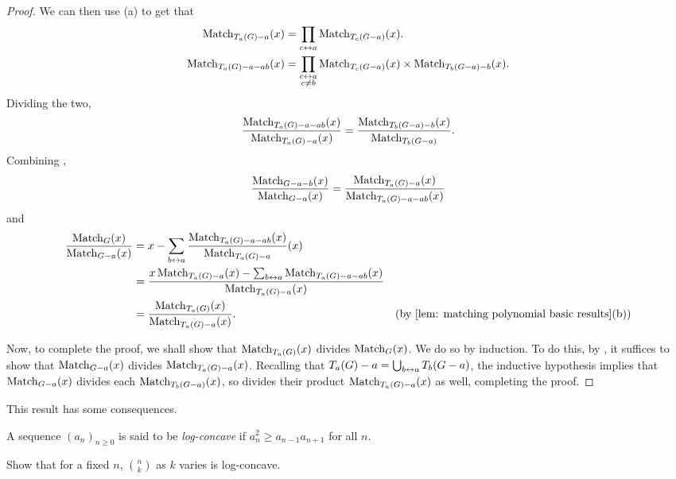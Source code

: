 \begin{proof}
		We can then use (a) to get that
		\begin{align*}
			\operatorname{Match}_{T_a(G)-a}(x) &= \prod_{c\leftrightarrow a} \operatorname{Match}_{T_c(G-a)}(x). \\
			\operatorname{Match}_{T_a(G)-a-ab}(x) &= \prod_{\substack{c \leftrightarrow a \\ c \ne b}} \operatorname{Match}_{T_c(G-a)}(x) \times \operatorname{Match}_{T_b(G-a)-b}(x).		
		\end{align*}
		Dividing the two,
		\begin{equation}
			\frac{\operatorname{Match}_{T_a(G)-a-ab}(x)}{\operatorname{Match}_{T_a(G)-a}(x)} = \frac{\operatorname{Match}_{T_b(G-a)-b}(x)}{\operatorname{Match}_{T_b(G-a)}}. \label{eqnmatch3}
		\end{equation}
		Combining ,
		\[ \frac{\operatorname{Match}_{G-a-b}(x)}{\operatorname{Match}_{G-a}(x)} = \frac{\operatorname{Match}_{T_a(G)-a}(x)}{\operatorname{Match}_{T_a(G)-a-ab}(x)} \]
		and
		\begin{align*}
			\frac{\Match_G(x)}{\Match_{G-a}(x)} &= x - \sum_{b\adj a} \frac{\Match_{T_a(G)-a-ab}(x)}{\Match_{T_a(G)-a}}(x) \\
				&= \frac{ x\Match_{T_a(G)-a}(x) - \sum_{b \adj a} \Match_{T_a(G)-a-ab}(x) }{\Match_{T_a(G)-a}(x)} \\
				&= \frac{\Match_{T_a(G)}(x)}{\Match_{T_a(G)-a}(x)}. & \text{(by \Cref{lem: matching polynomial basic results}(b))}
		\end{align*}

		Now, to complete the proof, we shall show that $\operatorname{Match}_{T_a(G)}(x)$ divides $\operatorname{Match}_{G}(x)$. We do so by induction. To do this, by , it suffices to show that $\operatorname{Match}_{G-a}(x)$ divides $\operatorname{Match}_{T_a(G)-a}(x)$. Recalling that $T_a(G)-a = \bigcup_{b \leftrightarrow a} T_b(G-a)$, the inductive hypothesis implies that $\operatorname{Match}_{G-a}(x)$ divides each $\operatorname{Match}_{T_b(G-a)}(x)$, so divides their product $\operatorname{Match}_{T_a(G)-a}(x)$ as well, completing the proof.
	\end{proof}

	
	This result has some consequences.

	\begin{fdef}
		A sequence $(a_n)_{n\ge0}$ is said to be \emph{log-concave} if $a_n^2 \ge a_{n-1} a_{n+1}$ for all $n$.
	\end{fdef}


	\begin{exercise}
		Show that for a fixed $n$, $\binom{n}{k}$ as $k$ varies is log-concave.
	\end{exercise}

